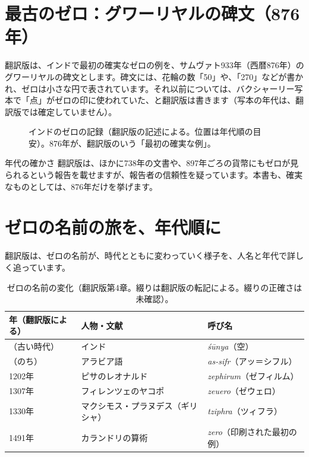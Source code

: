 \documentclass[a4paper,11pt,openany]{ltjsbook}
\begin{document}
\section{最古のゼロ：グワーリヤルの碑文（876年）}

翻訳版は、インドで最初の確実なゼロの例を、サムヴァト933年（西暦876年）のグワーリヤルの碑文とします。碑文には、花輪の数「50」や、「270」などが書かれ、ゼロは小さな円で表されています。それ以前については、バクシャーリー写本で「点」がゼロの印に使われていた、と翻訳版は書きます（写本の年代は、翻訳版では確定していません）。

\begin{figure}[htbp]
\centering
{}
\caption{インドのゼロの記録（翻訳版の記述による。位置は年代順の目安）。876年が、翻訳版のいう「最初の確実な例」。}
\end{figure}

\begin{notebox}{年代の確かさ}
翻訳版は、ほかに738年の文書や、897年ごろの貨幣にもゼロが見られるという報告を載せますが、報告者の信頼性を疑っています。本書も、確実なものとしては、876年だけを挙げます。
\end{notebox}

\section{ゼロの名前の旅を、年代順に}

翻訳版は、ゼロの名前が、時代とともに変わっていく様子を、人名と年代で詳しく追っています。

\begin{table}[htbp]
\centering
\begin{tabular}{lll}
\toprule
年（翻訳版による） & 人物・文献 & 呼び名\\
\midrule
（古い時代） & インド & \textit{śūnya}（空）\\
（のち） & アラビア語 & \textit{as-sifr}（アッ＝シフル）\\
1202年 & ピサのレオナルド & \textit{zephirum}（ゼフィルム）\\
1307年 & フィレンツェのヤコポ & \textit{zeuero}（ゼウェロ）\\
1330年 & マクシモス・プラヌデス（ギリシャ） & \textit{tziphra}（ツィフラ）\\
1491年 & カランドリの算術 & \textit{zero}（印刷された最初の例）\\
\bottomrule
\end{tabular}
\caption{ゼロの名前の変化（翻訳版第4章。綴りは翻訳版の転記による。綴りの正確さは未確認）。}
\end{table}
\end{document}
